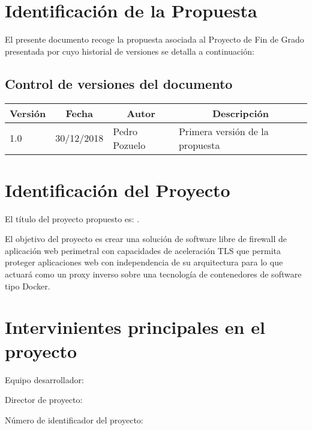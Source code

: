 \section{Identificación de la Propuesta}
El presente documento recoge la propuesta asociada al Proyecto de Fin de Grado {\em \titulo} presentada por
{\em \autor} cuyo historial de versiones se detalla a continuación:
\subsection{Control de versiones del documento}
\begin{center}
  \begin{tabularx}{0.8\textwidth} {llll}
		\multicolumn{1}{c}{\textbf{Versión}} &
		\multicolumn{1}{c}{\textbf{Fecha}} &
		\multicolumn{1}{c}{\textbf{Autor}} &
		\multicolumn{1}{c}{\textbf{Descripción}}\\
		\hline
    1.0 & 30/12/2018  & Pedro Pozuelo & Primera versión de la propuesta \\
  \end{tabularx}
\end{center}


\section{Identificación del Proyecto}
\par El título del proyecto propuesto es: {\em \titulo}.
\par El objetivo del proyecto es crear una solución de software libre de firewall de aplicación web perimetral con
capacidades de aceleración TLS que permita proteger aplicaciones web con in\-de\-pen\-den\-cia de su arquitectura
para lo que actuará como un proxy inverso sobre una tecnología de contenedores de software tipo Docker.


\section{Intervinientes principales en el proyecto}

\par Equipo desarrollador: \autor
\par Director de proyecto: \profesor
\par Número de identificador del proyecto: \PFGID

